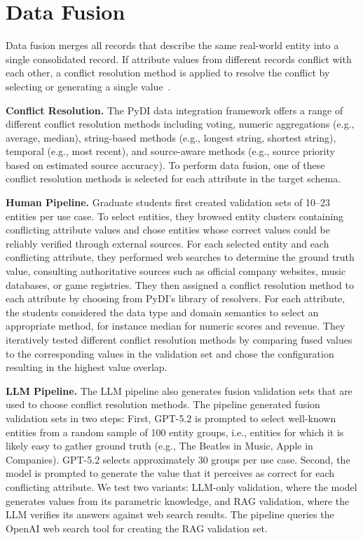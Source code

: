 \section{Data Fusion}
\label{sec:data_fusion}

Data fusion merges all records that describe the same real-world entity into a single consolidated record. If attribute values from different records conflict with each other, a conflict resolution method is applied to resolve the conflict by selecting or generating a single value~\cite{bleiholder2009data, naumann2006dataFusionThreeSteps}. 

\textbf{Conflict Resolution.}\label{sec:fusion_approach} 
The PyDI data integration framework offers a range of different conflict resolution methods including voting, numeric aggregations (e.g., average, median), string-based methods (e.g., longest string, shortest string), temporal (e.g., most recent), and source-aware methods (e.g., source priority based on estimated source accuracy). To perform data fusion, one of these conflict resolution methods is selected for each attribute in the target schema.

\textbf{Human Pipeline.} Graduate students first created validation sets of 10--23 entities per use case. To select entities, they browsed entity clusters containing conflicting attribute values and chose entities whose correct values could be reliably verified through external sources. For each selected entity and each conflicting attribute, they performed web searches to determine the ground truth value, consulting authoritative sources such as official company websites, music databases, or game registries. They then assigned a conflict resolution method to each attribute by choosing from PyDI's library of resolvers. For each attribute, the students considered the data type and domain semantics to select an appropriate method, for instance median for numeric scores and revenue. They iteratively tested different conflict resolution methods by comparing fused values to the corresponding values in the validation set and chose the configuration resulting in the highest value overlap.

\textbf{LLM Pipeline.} The LLM pipeline also generates fusion validation sets that are used to choose conflict resolution methods. The pipeline generated fusion validation sets in two steps: First, GPT-5.2 is prompted to select well-known entities from a random sample of 100 entity groups, i.e., entities for which it is likely easy to gather ground truth (e.g., The Beatles in Music, Apple in Companies). GPT-5.2 selects approximately 30 groups per use case. Second, the model is prompted to generate the value that it perceives as correct for each conflicting attribute. We test two variants: LLM-only validation, where the model generates values from its parametric knowledge, and RAG validation, where the LLM verifies its answers against web search results. The pipeline queries the OpenAI web search tool for creating the RAG validation set.

